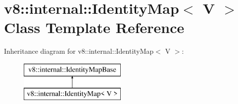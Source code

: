 \hypertarget{classv8_1_1internal_1_1_identity_map}{}\section{v8\+:\+:internal\+:\+:Identity\+Map$<$ V $>$ Class Template Reference}
\label{classv8_1_1internal_1_1_identity_map}
Inheritance diagram for v8\+:\+:internal\+:\+:Identity\+Map$<$ V $>$\+:\begin{figure}[H]
\begin{center}
\leavevmode
\includegraphics[height=2.000000cm]{classv8_1_1internal_1_1_identity_map}
\end{center}
\end{figure}
